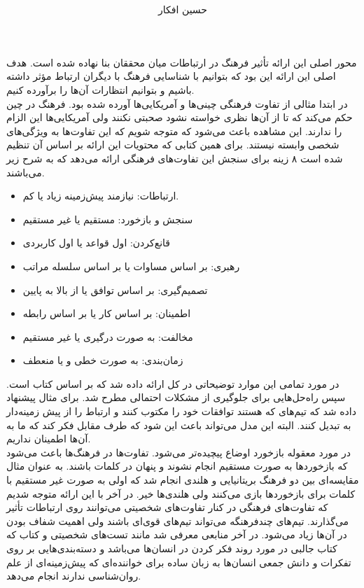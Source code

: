 \documentclass[a4paper, 11pt]{article}
\title{
   \lr{The Culture Map In Sciencentific Communication}
}
\author{حسین افکار}
\begin{document}
\maketitle
محور اصلی این ارائه تأثیر فرهنگ در ارتباطات میان محققان بنا نهاده شده است.
هدف اصلی این ارائه این بود که بتوانیم با شناسایی فرهنگ با دیگران ارتباط مؤثر داشته باشیم و بتوانیم
انتظارات آن‌ها را برآورده کنیم. \\
در ابتدا مثالی از تفاوت فرهنگی چینی‌ها و آمریکایی‌ها آورده شده بود. فرهنگ در چین حکم می‌کند
که تا از آن‌ها نظری خواسته نشود صحبتی نکنند ولی آمریکایی‌ها این الزام را ندارند.
این مشاهده باعث می‌شود که متوجه شویم که این تفاوت‌ها به ویژگی‌های شخصی وابسته نیستند.
برای همین کتابی که محتویات این ارائه بر اساس آن تنظیم شده است ۸ زینه برای سنجش
این تفاوت‌‌های فرهنگی ارائه می‌دهد که به شرح زیر می‌باشند.
\begin{itemize}
    \item ارتباطات: نیازمند پیش‌زمینه زیاد یا کم.
    \item سنجش و بازخورد: مستقیم یا غیر مستقیم
    \item قانع‌کردن: اول قواعد یا اول کاربردی
    \item رهبری: بر اساس مساوات یا بر اساس سلسله مراتب
    \item تصمیم‌گیری: بر اساس توافق یا از بالا به پایین
    \item اطمینان: بر اساس کار یا بر اساس رابطه
    \item مخالفت: به صورت درگیری یا غیر مستقیم
    \item زمان‌بندی: به صورت خطی و یا منعطف
\end{itemize}
در مورد تمامی این موارد توضیحاتی در کل ارائه داده شد که بر اساس کتاب
است.
سپس راه‌حل‌هایی برای جلوگیری از مشکلات احتمالی مطرح شد.
برای مثال پیشنهاد داده شد که تیم‌های که
هستند توافقات خود را مکتوب کنند و ارتباط را از پیش زمینه‌دار
به
تبدیل کنند. البته این مدل می‌تواند باعث این شود که طرف مقابل فکر کند که ما به آن‌ها اطمینان نداریم. \\
در مورد معقوله بازخورد اوضاع پیچیده‌تر می‌شود.
تفاوت‌ها در فرهنگ‌ها باعث می‌شود که بازخورد‌ها به صورت مستقیم انجام نشوند و پنهان در کلمات باشند.
به عنوان مثال مقایسه‌ای بین دو فرهنگ بریتانیایی و هلندی انجام شد که اولی به صورت
غیر مستقیم با کلمات برای بازخورد‌ها بازی می‌کنند ولی هلندی‌ها خیر.
در آخر با این ارائه متوجه شدیم که تفاوت‌های فرهنگی در کنار تفاوت‌های شخصیتی
می‌توانند روی ارتباطات تأثیر می‌گذارند. تیم‌های چندفرهنگه می‌تواند تیم‌های
قوی‌ای باشند ولی اهمیت شفاف بودن در آن‌‌ها زیاد می‌شود.
در آخر منابعی معرفی شد مانند تست‌های شخصیتی
و کتاب
که کتاب جالبی در مورد روند فکر کردن در انسان‌ها می‌باشد و دسته‌بندی‌هایی
بر روی تفکرات و دانش‌ جمعی انسان‌ها به زبان ساده برای خواننده‌ای که پیش‌زمینه‌ای از علم
روان‌شناسی ندارند انجام می‌دهد.
% 
\end{document}
